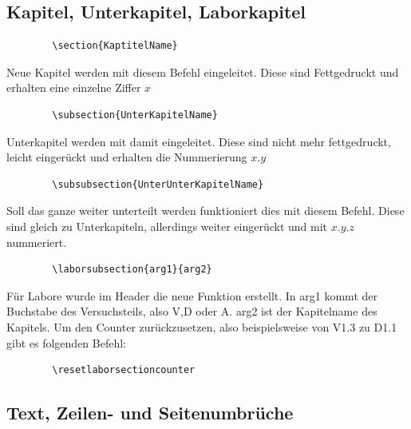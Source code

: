 	\subsection{Kapitel, Unterkapitel, Laborkapitel}
	\begin{verbatim}
		\section{KaptitelName}
	\end{verbatim}
	Neue Kapitel werden mit diesem Befehl eingeleitet. Diese sind Fettgedruckt und erhalten eine einzelne Ziffer $x$\newline
	\begin{verbatim}
		\subsection{UnterKapitelName}
	\end{verbatim}
	Unterkapitel werden mit  damit eingeleitet. Diese sind nicht mehr fettgedruckt, leicht eingerückt und erhalten die Nummerierung $x.y$\newline
	\begin{verbatim}
		\subsubsection{UnterUnterKapitelName}
	\end{verbatim}
	Soll das ganze weiter unterteilt werden funktioniert dies mit diesem Befehl. Diese sind gleich zu Unterkapiteln, allerdings weiter eingerückt und mit $x.y.z$ nummeriert.\newline
	\begin{verbatim}
		\laborsubsection{arg1}{arg2}
	\end{verbatim} 
	Für Labore wurde im Header die neue Funktion erstellt. In arg1 kommt der Buchstabe des Versuchsteils, also V,D oder A. arg2 ist der Kapitelname des Kapitels.\newline
	Um den Counter zurückzusetzen, also beispielsweise von V1.3 zu D1.1 gibt es folgenden Befehl:
	\begin{verbatim}
		\resetlaborsectioncounter
	\end{verbatim} 
	\subsection{Text, Zeilen- und Seitenumbrüche}
	
